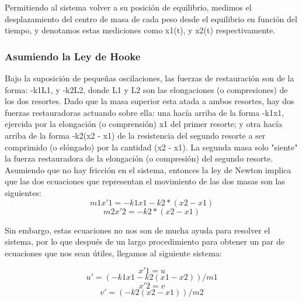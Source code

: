 \documentclass{article}
\begin{document}
Permitiendo al sistema volver a su posición de equilibrio, medimos el desplazamiento del centro de masa de cada peso desde el equilibrio en función del tiempo, y denotamos estas mediciones como x1(t), y x2(t) respectivamente.

\subsubsection {Asumiendo la Ley de Hooke}
Bajo la suposición de pequeñas oscilaciones, las fuerzas de restauración son de la forma: -k1L1, y -k2L2, donde L1 y L2 son las elongaciones (o compresiones) de los dos resortes. Dado que la masa superior esta atada a ambos resortes, hay dos fuerzas restauradoras actuando sobre ella: una hacía arriba de la forma -k1x1, ejercida por la elongación (o comprensión) x1 del primer resorte; y otra hacía arriba de la forma -k2(x2 - x1) de la resistencia del segundo resorte a ser comprimido (o elóngado) por la cantidad (x2 - x1). La segunda masa solo "siente" la fuerza restauradora de la elongación (o compresión) del segundo resorte.
Asumiendo que no hay fricción en el sistema, entonces la ley de Newton implica que las dos ecuaciones que representan el movimiento de las dos masas son las siguientes:
\begin{equation}
m1x'1 = -k1x1 - k2*(x2-x1)
\end{equation}
\begin{equation}
m2x'2 = - k2*(x2-x1)
\end{equation}

Sin embargo, estas ecuaciones no nos son de mucha ayuda para resolver el sistema, por lo que después de un largo procedimiento para obtener un par de ecuaciones que nos sean útiles, llegamos al siguiente sistema:

\begin{equation}
x'1 = u
\end{equation}
\begin{equation}
u' = (-k1x1 - k2(x1 - x2))/m1
\end{equation}
\begin{equation}
x'2 = v
\end{equation}
\begin{equation}
v' = (-k2(x2 -x1))/m2
\end{equation}
\end{document}

